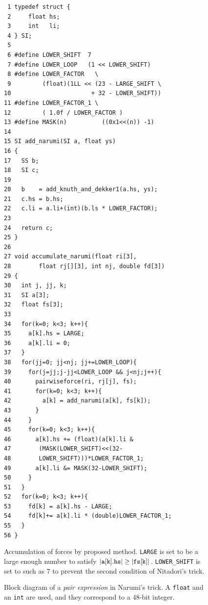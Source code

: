 \begin{figure}
\begin{center}\footnotesize
\begin{minipage}{100mm}\def\baselinestretch{0.8}
\vspace*{-2mm}
\begin{verbatim}
 1 typedef struct {
 2     float hs;
 3     int   li;
 4 } SI;
 5 
 6 #define LOWER_SHIFT  7
 7 #define LOWER_LOOP   (1 << LOWER_SHIFT)
 8 #define LOWER_FACTOR   \
 9         (float)(1LL << (23 - LARGE_SHIFT \
10                       + 32 - LOWER_SHIFT))
11 #define LOWER_FACTOR_1 \
12         ( 1.0f / LOWER_FACTOR ) 
13 #define MASK(n)          ((0x1<<(n)) -1)
14 
15 SI add_narumi(SI a, float ys)
16 {
17   SS b;
18   SI c;
19   
20   b    = add_knuth_and_dekker1(a.hs, ys);
21   c.hs = b.hs;
22   c.li = a.li+(int)(b.ls * LOWER_FACTOR);
23   
24   return c;
25 }
26  
27 void accumulate_narumi(float ri[3], 
28        float rj[][3], int nj, double fd[3])
29 {
30   int j, jj, k;
31   SI a[3];
32   float fs[3];
33 
34   for(k=0; k<3; k++){
35     a[k].hs = LARGE;
36     a[k].li = 0;
37   }
38   for(jj=0; jj<nj; jj+=LOWER_LOOP){
39     for(j=jj;j-jj<LOWER_LOOP && j<nj;j++){
40       pairwiseforce(ri, rj[j], fs);
41       for(k=0; k<3; k++){
42         a[k] = add_narumi(a[k], fs[k]);
43       }
44     }
45     for(k=0; k<3; k++){
46       a[k].hs += (float)(a[k].li & 
47        (MASK(LOWER_SHIFT)<<(32-
48        LOWER_SHIFT)))*LOWER_FACTOR_1;
49       a[k].li &= MASK(32-LOWER_SHIFT);
50     }
51   }
52   for(k=0; k<3; k++){
53     fd[k] = a[k].hs - LARGE;
54     fd[k]+= a[k].li * (double)LOWER_FACTOR_1;
55   }
56 }
\end{verbatim}\def\baselinestretch{1.0}
\end{minipage}
\caption{Accumulation of forces by proposed method.
{\tt LARGE} is set to be a large enough number to
satisfy $|{\tt a[k].hs}|\geq |{\tt fs[k]}|$. {\tt LOWER\_SHIFT}
is set to such as 7 to prevent the second condition
of Nitadori's trick.}
\label{fig:Narumi}
\vspace*{-4mm}
\end{center}
\end{figure}

\begin{figure}
\begin{center}
\caption{Block diagram of a {\it pair expression} in Narumi's trick.
A {\tt float} and an {\tt int} are used, and they correspond to
a 48-bit integer.}
\label{fig:narumiblock}
\vspace*{-5mm}
\end{center}
\end{figure}


